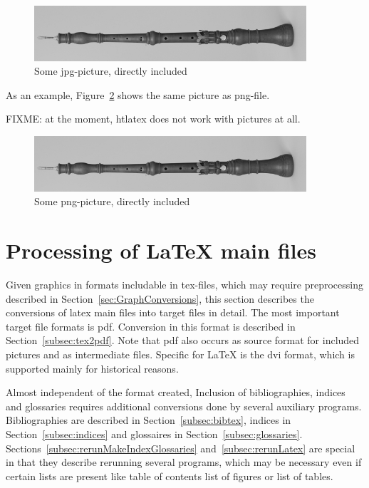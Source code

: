 \documentclass[12pt]{article}
\begin{document}
\begin{figure}[htb]
\begin{center}
\includegraphics[width=0.9\textwidth]{07someJpgOboeBaroqueDennerMIR370}%
\end{center}
\caption{\label{fig:asIsJpg}Some jpg-picture, directly included }
\end{figure}

As an example, Figure~\ref{fig:asIsPng} shows the same picture 
as png-file. 

FIXME: at the moment, htlatex does not work with pictures at all. 

\begin{figure}[htb]
\begin{center}
\includegraphics[width=0.9\textwidth]{08somePngOboeBaroqueDennerMIR370}%
\end{center}
\caption{\label{fig:asIsPng}Some png-picture, directly included }
\end{figure}



\section{Processing of \LaTeX{} main files}\label{sec:latexMainConversions}

Given graphics in formats includable in tex-files, 
which may require preprocessing described in 
Section~\ref{sec:GraphConversions}, 
this section describes the conversions of latex main files 
into target files in detail. 
The most important target file formats is \gls{pdf}. 
Conversion in this format is described in Section~\ref{subsec:tex2pdf}. 
Note that \gls{pdf} also occurs as source format 
for included pictures and as intermediate files. 
Specific for \LaTeX{} is the \gls{dvi} format, 
which is supported mainly for historical reasons. 

Almost independent of the format created, 
Inclusion of bibliographies, indices and glossaries 
requires additional conversions 
done by several auxiliary programs. 
Bibliographies are described in Section~\ref{subsec:bibtex}, 
indices in Section~\ref{subsec:indices} 
and glossaires in Section~\ref{subsec:glossaries}. 
Sections~\ref{subsec:rerunMakeIndexGlossaries} 
and~\ref{subsec:rerunLatex} 
are special in that they describe rerunning several programs, 
which may be necessary even if certain lists are present 
like table of contents list of figures or list of tables. 
\end{document}
